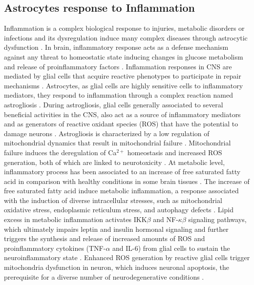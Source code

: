 \subsection*{Astrocytes response to Inflammation}
Inflammation is a complex biological response to injuries, metabolic disorders or infections and its dysregulation induce many complex diseases through astrocytic dysfunction \cite{Masel2010,Yan2013,Jha2016}. In brain, inflammatory response acts as a defense mechanism against any threat to homeostatic state inducing changes in glucose metabolism and release of proinflammatory factors \cite{Allaman2011}. Inflammation responses in CNS are mediated by glial cells that acquire reactive phenotypes to participate in repair mechanisms \cite{Takuma2004,Fitch2008,Jha2016}. Astrocytes, as glial cells are highly sensitive cells to inflammatory mediators, they respond to inflammation through a complex reaction named astrogliosis \cite{Dowell2009a}. During astrogliosis, glial cells generally associated to several beneficial activities in the CNS, also act as a source of inflammatory mediators and as generators of reactive oxidant species (ROS) that have the potential to damage neurons \cite{Molofsk2012}. Astrogliosis is characterized by a low regulation of mitochondrial dynamics that result in mitochondrial failure \cite{Sidoryk-Wegrzynowicz2013}.  Mitochondrial failure induces the deregulation of Ca$^{2+}$ homeostasis and increased ROS generation, both of which are linked to neurotoxicity \cite{Lange2012}. At metabolic level, inflammatory process has been associated to an increase of free saturated fatty acid in comparison with healthy conditions in some brain tissues \cite{Gupta2012}. The increase of free saturated fatty acid induce metabolic inflammation, a response associated with the induction of diverse intracellular stresses, such as mitochondrial oxidative stress, endoplasmic reticulum stress, and autophagy defects \cite{Jha2016}. Lipid excess in metabolic inflammation activates IKK$\beta$ and NF-$\kappa\beta$ signaling pathways, which ultimately impairs leptin and insulin hormonal signaling and further triggers the synthesis and release of increased amounts of ROS and proinflammatory cytokines (TNF-$\alpha$ and IL-6) from glial cells to sustain the neuroinflammatory state \cite{Purkayastha2015}. Enhanced ROS generation by reactive glial cells trigger mitochondria dysfunction in neuron, which induces neuronal apoptosis, the prerequisite for a diverse number of neurodegenerative conditions \cite{K.2006}.

